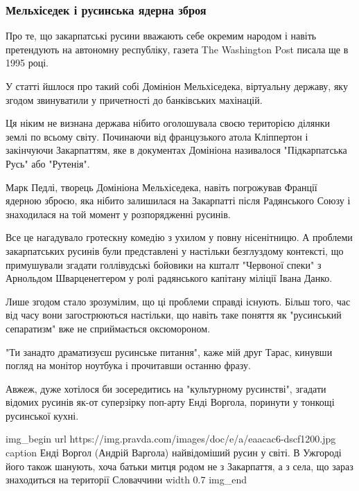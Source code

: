  
 
 

\subsubsection{Мельхіседек і русинська ядерна зброя}

Про те, що закарпатські русини вважають себе окремим народом і навіть
претендують на автономну республіку, газета The Washington Post писала ще в
1995 році.

У статті йшлося про такий собі Домініон Мельхіседека, віртуальну державу, яку
згодом звинуватили у причетності до банківських махінацій.

Ця ніким не визнана держава нібито оголошувала своєю територією ділянки землі
по всьому світу. Починаючи від французького атола Кліппертон і закінчуючи
Закарпаттям, яке в документах Домініона називалося "Підкарпатська Русь" або
"Рутенія".

Марк Педлі, творець Домініона Мельхіседека, навіть погрожував Франції ядерною
зброєю, яка нібито залишилася на Закарпатті після Радянського Союзу і
знаходилася на той момент у розпорядженні русинів.

Все це нагадувало гротескну комедію з ухилом у повну нісенітницю. А проблеми
закарпатських русинів були представлені у настільки безглуздому контексті, що
примушували згадати голлівудські бойовики на кшталт "Червоної спеки" з
Арнольдом Шварценеггером у ролі радянського капітану міліції Івана Данко. 

Лише згодом стало зрозумілим, що ці проблеми справді існують. Більш того, час
від часу вони загострюються настільки, що навіть таке поняття як "русинський
сепаратизм" вже не сприймається оксюмороном.

"Ти занадто драматизуєш русинське питання", \dshM каже мій друг Тарас, кинувши
погляд на монітор ноутбука і прочитавши останню фразу.

Авжеж, дуже хотілося би зосередитись на "культурному русинстві", згадати
відомих русинів як-от суперзірку поп-арту Енді Воргола, поринути у тонкощі
русинської кухні.

\ifcmt
img_begin 
    url https://img.pravda.com/images/doc/e/a/eaacac6-dscf1200.jpg
    caption Енді Воргол (Андрій Варгола) \dshM найвідоміший русин у світі. В Ужгороді його також шанують, хоча батьки митця родом не з Закарпаття, а з села, що зараз знаходиться на території Словаччини
    width 0.7
img_end
\fi

